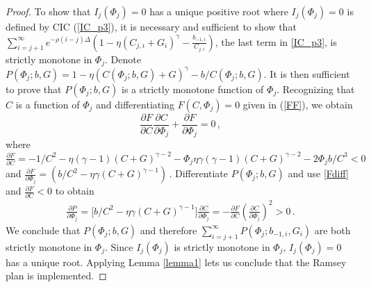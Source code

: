 \documentclass[12pt]{article}
\newcommand{\NW}[1]{{\textcolor{blue}{#1}}}
\begin{document}
\begin{proof}
To show that $I_j(\Phi_j)  =0$  has a  unique positive root where $I_j(\Phi_j)  =0$ is defined by  CIC (\ref{IC_p3}), it is necessary and sufficient to show that $\sum_{i=j+1}^\infty e^{-\rho(i-j)\Delta} \left( 1-\eta(C_{j, i}+G_{i})^\gamma-\frac{b_{-1, i}}{C_{j, i}} \right)$, the last term in \eqref{IC_p3}, 
is strictly monotone in $\Phi_j$. Denote $P(\Phi_j; b, G) = 1-\eta\left(C(\Phi_j; b, G)+G\right)^\gamma-b/C(\Phi_j; b, G)$. It is then sufficient to prove that $P(\Phi_j; b, G)$ is a strictly monotone function of $\Phi_j$. Recognizing that $C$ is a function of $\Phi_j$ and differentiating $F(C, \Phi_j)=0$ given in (\ref{FF}), we obtain  %
\begin{equation}\label{Fdiff}
	\frac{\partial F}{\partial C}\frac{\partial C}{\partial \Phi_j} + \frac{\partial F}{\partial \Phi_j} =0\,,
\end{equation}
where 
$
\frac{\partial F}{\partial C} = -{1}/{C^2} -\eta(\gamma-1)(C+G)^{\gamma-2}-\Phi_j\eta\gamma(\gamma-1) (C+G)^{\gamma-2}-{2\Phi_j b}/{C^3}< 0\,$ and %
$\frac{\partial F}{\partial \Phi_j}  =  \left(b/C^2- \eta\gamma (C+G)^{\gamma-1}  \right)\,.$ %
Differentiate $P(\Phi_j; b, G)$ and use   \eqref{Fdiff} and $\frac{\partial F}{\partial C}<0$ to obtain
\begin{eqnarray}
	\frac{\partial P}{\partial \Phi_j}  =  \bigg[  b/C^2- \eta\gamma (C+G)^{\gamma-1}   \bigg] \frac{\partial C}{\partial \Phi_j} = - \frac{\partial F}{\partial C}\left( \frac{\partial C}{\partial \Phi_j} \right)^2 >0\, . 
\end{eqnarray}
We conclude  that $P(\Phi_j; b, G)$ and therefore $\sum_{i=j+1}^\infty P(\Phi_j; b_{-1, i}, G_{i})$  are both strictly monotone in $\Phi_j$. %
Since $I_j(\Phi_j)$  is strictly monotone in $\Phi_j$, $I_j(\Phi_j)=0$ has a unique root. Applying  Lemma \ref{lemma1} lets us conclude that  the Ramsey plan is implemented. 

\end{proof}

\end{document}
